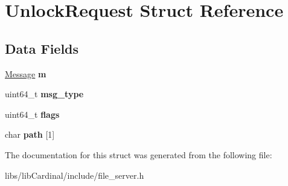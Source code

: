 \hypertarget{structUnlockRequest}{}\section{Unlock\+Request Struct Reference}
\label{structUnlockRequest}
\subsection*{Data Fields}
\begin{DoxyCompactItemize}
\item 
\hyperlink{structMessage}{Message} {\bfseries m}\hypertarget{structUnlockRequest_a40c760362a1b731fc9dab523f5a945f9}{}\label{structUnlockRequest_a40c760362a1b731fc9dab523f5a945f9}

\item 
uint64\+\_\+t {\bfseries msg\+\_\+type}\hypertarget{structUnlockRequest_a4c7bb8bbf665fd108b106b1b3016773c}{}\label{structUnlockRequest_a4c7bb8bbf665fd108b106b1b3016773c}

\item 
uint64\+\_\+t {\bfseries flags}\hypertarget{structUnlockRequest_a509ab305ba06f55aed69d761fc03a962}{}\label{structUnlockRequest_a509ab305ba06f55aed69d761fc03a962}

\item 
char {\bfseries path} \mbox{[}1\mbox{]}\hypertarget{structUnlockRequest_a2f75c52d3699c04c186d8f96470e8334}{}\label{structUnlockRequest_a2f75c52d3699c04c186d8f96470e8334}

\end{DoxyCompactItemize}


The documentation for this struct was generated from the following file\+:\begin{DoxyCompactItemize}
\item 
libs/lib\+Cardinal/include/file\+\_\+server.\+h\end{DoxyCompactItemize}
